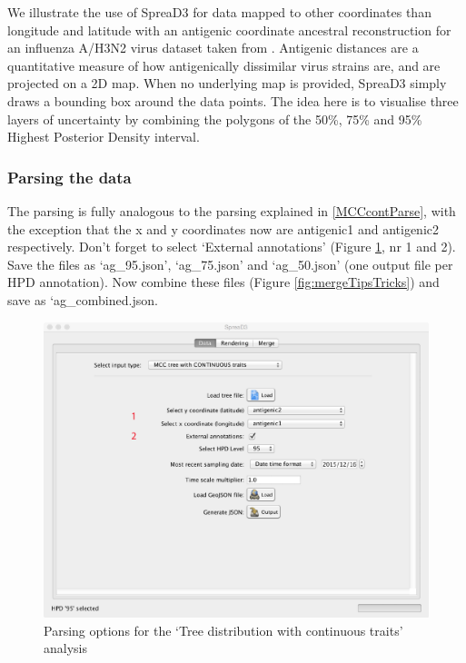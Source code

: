\documentclass[english]{paper}
\def \spreadname {SpreaD3}
\begin{document}
We illustrate the use of {\spreadname} for data mapped to other coordinates than longitude and latitude with an antigenic coordinate ancestral reconstruction for an influenza A/H3N2 virus dataset taken from \citet{Bedford:2014aa}.
Antigenic distances are a quantitative measure of how antigenically dissimilar virus strains are, and are projected on a 2D map.
When no underlying map is provided, {\spreadname} simply draws a bounding box around the data points.
The idea here is to visualise three layers of uncertainty by combining the polygons of the 50\%, 75\% and 95\% Highest Posterior Density interval.

\subsubsection{Parsing the data}

The parsing is fully analogous to the parsing explained in \ref{MCCcontParse}, with the exception that the x and y coordinates now are antigenic1 and antigenic2 respectively.
Don't forget to select `External annotations' (Figure \ref{fig:parseTipsTricks}, nr 1 and 2). 
Save the files as `ag\_95.json', `ag\_75.json' and `ag\_50.json' (one output file per HPD annotation). 
Now combine these files (Figure \ref{fig:mergeTipsTricks}) and save as `ag\_combined.json.

\begin{figure}%
\centering
\includegraphics[width=1\textwidth]{./figures/new_ag_parse.pdf} 
\caption{Parsing options for the `Tree distribution with continuous traits' analysis}
\label{fig:parseTipsTricks}
\end{figure}
\end{document}
